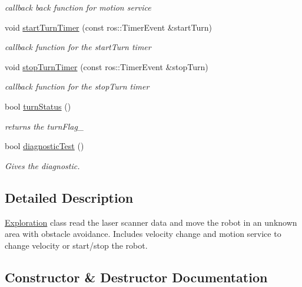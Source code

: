 \begin{DoxyCompactItemize}
\begin{DoxyCompactList}\small\item\em callback back function for motion service \end{DoxyCompactList}\item 
void \hyperlink{class_exploration_a4311b2bb1ccc4aec5c800c9695e8974d}{start\+Turn\+Timer} (const ros\+::\+Timer\+Event \&start\+Turn)
\begin{DoxyCompactList}\small\item\em callback function for the start\+Turn timer \end{DoxyCompactList}\item 
void \hyperlink{class_exploration_a04d03dc4617421fc9a7896b3487005f4}{stop\+Turn\+Timer} (const ros\+::\+Timer\+Event \&stop\+Turn)
\begin{DoxyCompactList}\small\item\em callback function for the stop\+Turn timer \end{DoxyCompactList}\item 
bool \hyperlink{class_exploration_afceabf3b550d89c9dc3a6d55f986e27e}{turn\+Status} ()
\begin{DoxyCompactList}\small\item\em returns the turn\+Flag\+\_\+ \end{DoxyCompactList}\item 
bool \hyperlink{class_exploration_a038a9972b8de7a912ff8421ea71471c1}{diagnostic\+Test} ()
\begin{DoxyCompactList}\small\item\em Gives the diagnostic. \end{DoxyCompactList}\end{DoxyCompactItemize}


\subsection{Detailed Description}
\hyperlink{class_exploration}{Exploration} class read the laser scanner data and move the robot in an unknown area with obstacle avoidance. Includes velocity change and motion service to change velocity or start/stop the robot. 

\subsection{Constructor \& Destructor Documentation}
